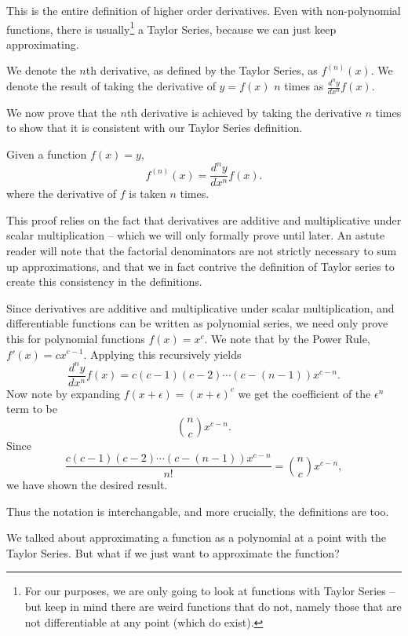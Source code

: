 \documentclass{article}
\begin{document}
This is the entire definition of higher order derivatives. Even with non-polynomial functions, there is usually\footnote{For our purposes, we are only going to look at functions with Taylor Series -- but keep in mind there are weird functions that do not, namely those that are not differentiable at any point (which do exist).} a Taylor Series, because we can just keep approximating.

\begin{defi}
We denote the $n$th derivative, as defined by the Taylor Series, as $f^{(n)}(x).$ We denote the result of taking the derivative of $y=f(x)$ $n$ times as $\frac{d^ny}{dx^n}f(x).$
\end{defi}

We now prove that the $n$th derivative is achieved by taking the derivative $n$ times to show that it is consistent with our Taylor Series definition.

\begin{theo}
Given a function $f(x)=y,$
\[f^{(n)}(x)=\frac{d^ny}{dx^n}f(x).\]
where the derivative of $f$ is taken $n$ times.
\end{theo}

This proof relies on the fact that derivatives are additive and multiplicative under scalar multiplication -- which we will only formally prove until later. An astute reader will note that the factorial denominators are not strictly necessary to sum up approximations, and that we in fact contrive the definition of Taylor series to create this consistency in the definitions.

\begin{pro}
Since derivatives are additive and multiplicative under scalar multiplication, and differentiable functions can be written as polynomial series, we need only prove this for polynomial functions $f(x)=x^c.$ We note that by the Power Rule, $f'(x)=cx^{c-1}.$ Applying this recursively yields
\[\frac{d^ny}{dx^n}f(x)=c(c-1)(c-2)\cdots(c-(n-1))x^{c-n}.\]
Now note by expanding $f(x+\epsilon)=(x+\epsilon)^c$ we get the coefficient of the $\epsilon^n$ term to be
\[\binom{n}{c}x^{c-n}.\]
Since
\[\frac{c(c-1)(c-2)\cdots(c-(n-1))x^{c-n}}{n!}=\binom{n}{c}x^{c-n},\]
we have shown the desired result.
\end{pro}

Thus the notation is interchangable, and more crucially, the definitions are too.

We talked about approximating a function as a polynomial at a point with the Taylor Series. But what if we just want to approximate the function?
\end{document}
